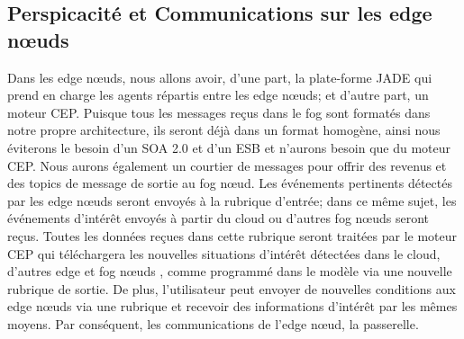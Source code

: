 \subsection{Perspicacité et Communications sur les edge nœuds}
Dans les edge nœuds, nous allons avoir, d'une part, la plate-forme JADE qui prend en charge les agents répartis entre les edge nœuds; et d'autre part, un moteur CEP. Puisque tous les messages reçus dans le fog sont formatés dans notre propre architecture, ils seront déjà dans un format homogène, ainsi nous éviterons le besoin d'un SOA 2.0 et d'un ESB et n'aurons besoin que du moteur CEP. Nous aurons également un courtier de messages pour offrir des revenus et des topics de message de sortie au fog nœud. Les événements pertinents détectés par les edge nœuds seront envoyés à la rubrique d'entrée; dans ce même sujet, les événements d'intérêt envoyés à partir du cloud ou d'autres fog nœuds seront reçus. Toutes les données reçues dans cette rubrique seront traitées par le moteur CEP qui téléchargera les nouvelles situations d'intérêt détectées dans le cloud, d'autres edge et fog nœuds , comme programmé dans le modèle via une nouvelle rubrique de sortie. De plus, l'utilisateur peut envoyer de nouvelles conditions aux edge nœuds via une rubrique et recevoir des informations d'intérêt par les mêmes moyens. Par conséquent, les communications de l’edge nœud, la passerelle.



